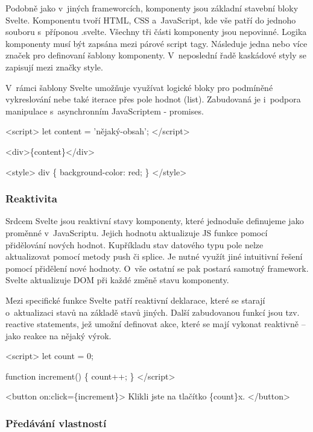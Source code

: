Podobně jako v~jiných frameworcích, komponenty jsou základní stavební bloky Svelte. Komponentu tvoří HTML, CSS a~JavaScript, kde vše patří do jednoho souboru s~příponou .svelte. 
Všechny tři části komponenty jsou nepovinné. Logika komponenty musí být zapsána mezi párové script tagy. Následuje jedna nebo více značek pro definovaní šablony komponenty. 
V~neposlední řadě kaskádové styly se zapisují mezi značky style.

V~rámci šablony Svelte umožňuje využívat logické bloky pro podmíněné vykreslování nebe také iterace přes pole hodnot (list). 
Zabudovaná je i~podpora manipulace s~asynchronním JavaScriptem - promises.\cite{svelte}

\begin{prog}
<script>
  let content = 'nějaký-obsah';
</script>

<div>\{content\}</div>
  
<style>
  div \{
    background-color: red;
  \}
</style>
\end{prog}

\subsubsection{Reaktivita}

Srdcem Svelte jsou reaktivní stavy komponenty, které jednoduše definujeme jako proměnné v~JavaScriptu. Jejich hodnotu aktualizuje JS funkce pomocí přidělování nových hodnot. 
Kupříkladu stav datového typu pole nelze aktualizovat pomocí metody push či splice. Je nutné využít jiné intuitivní řešení pomocí přidělení nové hodnoty.
O~vše ostatní se pak postará samotný framework. Svelte aktualizuje DOM při každé změně stavu komponenty. 

Mezi specifické funkce Svelte patří reaktivní deklarace, které se starají o~aktualizaci stavů na základě stavů jiných. 
Další zabudovanou funkcí jsou tzv. reactive statements, jež umožní definovat akce, které se mají vykonat reaktivně -- jako reakce na nějaký výrok.\cite{sveltehandbook,svelte}

\begin{prog}
<script>
  let count = 0;

  function increment() \{
    count++;
  \}
</script>

<button on:click=\{increment\}>
  Klikli jste na tlačítko \{count\}x.
</button>
\end{prog}

\subsubsection{Předávání vlastností}

